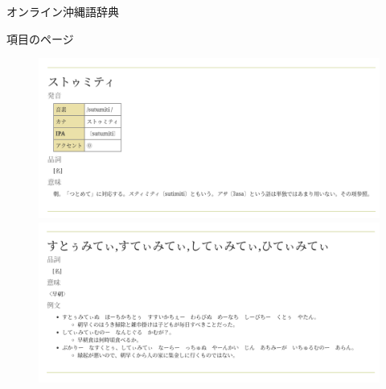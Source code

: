 \documentclass[14pt]{beamer}
\begin{document}
\begin{frame}{オンライン沖縄語辞典}
  \begin{block}{項目のページ}
    \begin{figure}[ht]
      \centering
      \includegraphics[height=0.35\paperheight]{okinawago-app-definition-example-sutumiti.png}
      \includegraphics[height=0.35\paperheight]{okinawago-app-definition-example-sutumiti2.png}
    \end{figure}
  \end{block}
\end{frame}
\end{document}
